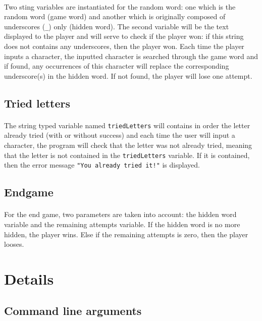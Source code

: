 \documentclass{report}
\begin{document}
\paragraph{} Two sting variables are instantiated for the random word: one
which is the random word (game word) and another which is originally composed
of underscores (\texttt{\_}) only (hidden word). The second variable will be
the text displayed to the player and will serve to check if the player won: if
this string does not contains any underscores, then the player won. Each time
the player inputs a character, the inputted character is searched through the
game word and if found, any occurrences of this character will replace the
corresponding underscore(s) in the hidden word. If not found, the player will
lose one attempt.

\subsection{Tried letters}

\paragraph{} The string typed variable named \texttt{triedLetters} will
contains in order the letter already tried (with or without success) and each
time the user will input a character, the program will check that the letter
was not already tried, meaning that the letter is not contained in the
\texttt{triedLetters} variable. If it is contained, then the error message
\lstinline[style=prog]|"You already tried it!"| is displayed.

\subsection{Endgame}

\paragraph{} For the end game, two parameters are taken into account: the
hidden word variable and the remaining attempts variable. If the hidden word is
no more hidden, the player wins. Else if the remaining attempts is zero, then
the player looses.

\section{Details}

\subsection{Command line arguments}
\end{document}
